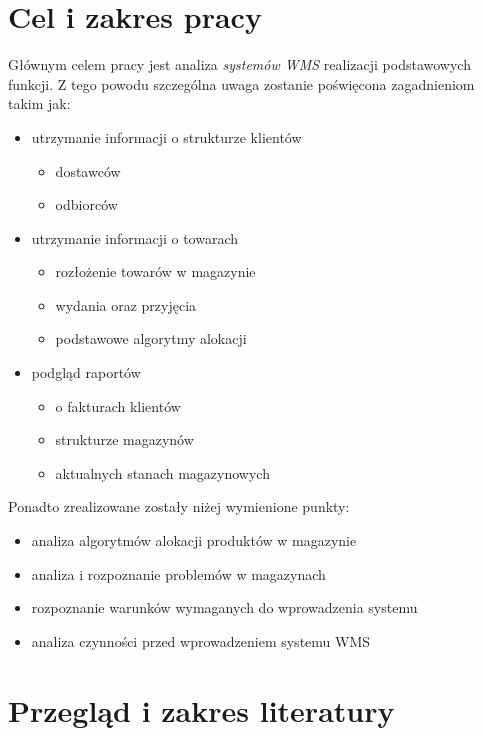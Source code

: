 \section{Cel i zakres pracy}
	\hspace{10pt}Głównym celem pracy jest analiza \emph{systemów WMS} realizacji 
	podstawowych funkcji. Z tego powodu szczególna uwaga zostanie poświęcona zagadnieniom
	takim jak:
	\begin{itemize}
		\item utrzymanie informacji o strukturze klientów
		\begin{itemize}
			\item dostawców
			\item odbiorców
		\end{itemize}
		\item utrzymanie informacji o towarach
		\begin{itemize}
			\item rozłożenie towarów w magazynie
			\item wydania oraz przyjęcia
			\item podstawowe algorytmy alokacji
		\end{itemize}
		\item podgląd raportów
		\begin{itemize}
			\item o fakturach klientów
			\item strukturze magazynów
			\item aktualnych stanach magazynowych
		\end{itemize}
	\end{itemize}
	
	Ponadto zrealizowane zostały niżej wymienione punkty:
	\begin{itemize}
		\item analiza algorytmów alokacji produktów w magazynie
		\item analiza i rozpoznanie problemów w magazynach
		\item rozpoznanie warunków wymaganych do wprowadzenia systemu
		\item analiza czynności przed wprowadzeniem systemu WMS
	\end{itemize}

\section{Przegląd i zakres literatury}
